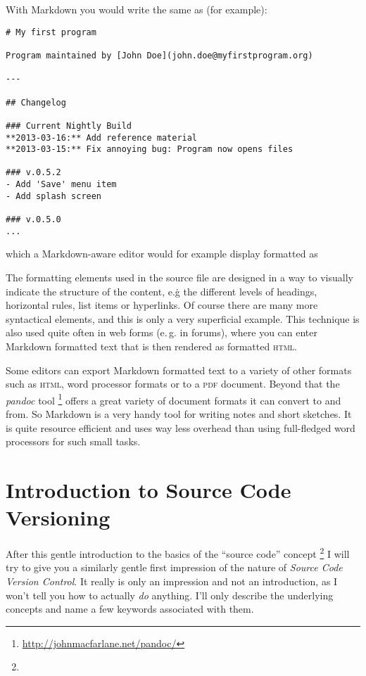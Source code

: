 \documentclass[../../LilyPond-Tutorials]{subfiles}
\begin{document}
With Markdown you would write the same as (for example):
\begin{lstlisting}[frame=single]
# My first program

Program maintained by [John Doe](john.doe@myfirstprogram.org)

---

## Changelog

### Current Nightly Build
**2013-03-16:** Add reference material  
**2013-03-15:** Fix annoying bug: Program now opens files

### v.0.5.2
- Add 'Save' menu item
- Add splash screen

### v.0.5.0
...
\end{lstlisting}

\noindent which a Markdown-aware editor would for example display formatted as


The formatting elements used in the source file are designed in a way to visually indicate the structure of the content, e.\.g the different levels of headings, horizontal rules, list items or hyperlinks.
Of course there are many more syntactical elements, and this is only a very superficial example.
This technique is also used quite often in web forms (e.\,g. in forums), where you can enter Markdown formatted text that is then rendered as formatted \textsc{html}.

Some editors can export Markdown formatted text to a variety of other formats such as \textsc{html}, word processor formats or to a \textsc{pdf} document.
Beyond that the \emph{pandoc} tool%
\footnote{\url{http://johnmacfarlane.net/pandoc/}}
offers a great variety of document formats it can convert to and from.
So Markdown is a very handy tool for writing notes and short sketches.
It is quite resource efficient and uses way less overhead than using full-fledged word processors for such small tasks.



\section{Introduction to Source Code Versioning}
\label{sec:intro-versioning}

After this gentle introduction to the basics of the “source code” concept%
\footnote{}
I will try to give you a similarly gentle first impression of the nature of \emph{Source Code Version Control}.
It really is only an impression and not an introduction, as I won't tell you how to actually \emph{do} anything.
I'll only describe the underlying concepts and name a few keywords associated with them.
\end{document}
